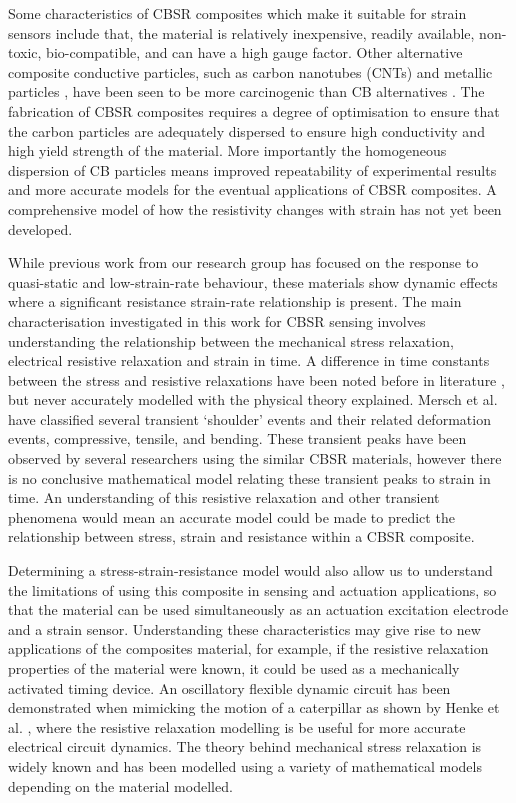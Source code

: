Some characteristics of CBSR composites which make it suitable for strain sensors include that, the material is relatively inexpensive, readily available, non-toxic, bio-compatible, and can have a high gauge factor. Other alternative composite conductive particles, such as carbon nanotubes (CNTs) \cite{Maddipatla2017,Wang2013} and metallic particles \cite{Quinsaat2015,Racles2021}, have been seen to be more carcinogenic than CB alternatives \cite{Fukushima2018,Ferdous2020,Rausch2004}. The fabrication of CBSR composites requires a degree of optimisation to ensure that the carbon particles are adequately dispersed to ensure high conductivity and high yield strength of the material. More importantly the homogeneous dispersion of CB particles means improved repeatability of experimental results and more accurate models for the eventual applications of CBSR composites. A comprehensive model of how the resistivity changes with strain has not yet been developed. 

While previous work from our research group \cite{Giffney2017,Devaraj2018} has focused on the response to quasi-static and low-strain-rate behaviour, these materials show dynamic effects where a significant resistance strain-rate relationship is present. The main characterisation investigated in this work for CBSR sensing involves understanding the relationship between the mechanical stress relaxation, electrical resistive relaxation and strain in time. A difference in time constants between the stress and resistive relaxations have been noted before in literature \cite{Kost1994,Wang2013,Maddipatla2017,Wang2004}, but never accurately modelled with the physical theory explained. Mersch et al. \cite{Mersch2020} have classified several transient `shoulder' events and their related deformation events, compressive, tensile, and bending. These transient peaks have been observed by several researchers using the similar CBSR materials, however there is no conclusive mathematical model relating these transient peaks to strain in time. An understanding of this resistive relaxation and other transient phenomena would mean an accurate model could be made to predict the relationship between stress, strain and resistance within a CBSR composite. 

Determining a stress-strain-resistance model would also allow us to understand the limitations of using this composite in sensing and actuation applications, so that the material can be used simultaneously as an actuation excitation electrode and a strain sensor. Understanding these characteristics may give rise to new applications of the composites material, for example, if the resistive relaxation properties of the material were known, it could be used as a mechanically activated timing device. An oscillatory flexible dynamic circuit has been demonstrated when mimicking the motion of a caterpillar as shown by Henke et al. \cite{Henke2018}, where the resistive relaxation modelling is be useful for more accurate electrical circuit dynamics. The theory behind mechanical stress relaxation is widely known and has been modelled using a variety of mathematical models \cite{Fung1993} depending on the material modelled. 

